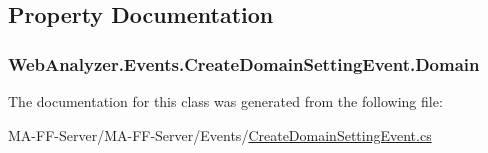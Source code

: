\subsection{Property Documentation}
\hypertarget{class_web_analyzer_1_1_events_1_1_create_domain_setting_event_a38563439a3da6789afcb3dc1e3fb30e3}{}
\subsubsection[{Domain}]{ Web\+Analyzer.\+Events.\+Create\+Domain\+Setting\+Event.\+Domain\hspace{0.3cm}{\ttfamily [get]}}\label{class_web_analyzer_1_1_events_1_1_create_domain_setting_event_a38563439a3da6789afcb3dc1e3fb30e3}


The documentation for this class was generated from the following file\+:\begin{DoxyCompactItemize}
\item 
M\+A-\/\+F\+F-\/\+Server/\+M\+A-\/\+F\+F-\/\+Server/\+Events/\hyperlink{_create_domain_setting_event_8cs}{Create\+Domain\+Setting\+Event.\+cs}\end{DoxyCompactItemize}
